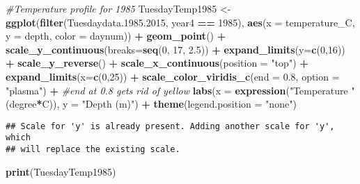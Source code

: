 \documentclass[]{article}
\newenvironment{Shaded}{\begin{snugshade}}{\end{snugshade}}
\newcommand{\CommentTok}[1]{\textcolor[rgb]{0.56,0.35,0.01}{\textit{#1}}}
\newcommand{\DataTypeTok}[1]{\textcolor[rgb]{0.13,0.29,0.53}{#1}}
\newcommand{\DecValTok}[1]{\textcolor[rgb]{0.00,0.00,0.81}{#1}}
\newcommand{\FloatTok}[1]{\textcolor[rgb]{0.00,0.00,0.81}{#1}}
\newcommand{\KeywordTok}[1]{\textcolor[rgb]{0.13,0.29,0.53}{\textbf{#1}}}
\newcommand{\NormalTok}[1]{#1}
\newcommand{\OperatorTok}[1]{\textcolor[rgb]{0.81,0.36,0.00}{\textbf{#1}}}
\newcommand{\StringTok}[1]{\textcolor[rgb]{0.31,0.60,0.02}{#1}}
\begin{document}
\begin{Shaded}
\begin{Highlighting}[]
\CommentTok{#Temperature profile for 1985 }
\NormalTok{TuesdayTemp1985 <-}\StringTok{ }
\StringTok{  }\KeywordTok{ggplot}\NormalTok{(}\KeywordTok{filter}\NormalTok{(Tuesdaydata.}\FloatTok{1985.2015}\NormalTok{, year4 }\OperatorTok{==}\StringTok{ }\DecValTok{1985}\NormalTok{), }\KeywordTok{aes}\NormalTok{(}\DataTypeTok{x =}\NormalTok{ temperature_C, }\DataTypeTok{y =}\NormalTok{ depth, }\DataTypeTok{color =}\NormalTok{ daynum)) }\OperatorTok{+}
\StringTok{  }\KeywordTok{geom_point}\NormalTok{() }\OperatorTok{+}
\StringTok{  }\KeywordTok{scale_y_continuous}\NormalTok{(}\DataTypeTok{breaks=}\KeywordTok{seq}\NormalTok{(}\DecValTok{0}\NormalTok{, }\DecValTok{17}\NormalTok{, }\FloatTok{2.5}\NormalTok{)) }\OperatorTok{+}
\StringTok{  }\KeywordTok{expand_limits}\NormalTok{(}\DataTypeTok{y=}\KeywordTok{c}\NormalTok{(}\DecValTok{0}\NormalTok{,}\DecValTok{16}\NormalTok{)) }\OperatorTok{+}
\StringTok{  }\KeywordTok{scale_y_reverse}\NormalTok{() }\OperatorTok{+}
\StringTok{  }\KeywordTok{scale_x_continuous}\NormalTok{(}\DataTypeTok{position =} \StringTok{"top"}\NormalTok{) }\OperatorTok{+}
\StringTok{  }\KeywordTok{expand_limits}\NormalTok{(}\DataTypeTok{x=}\KeywordTok{c}\NormalTok{(}\DecValTok{0}\NormalTok{,}\DecValTok{25}\NormalTok{)) }\OperatorTok{+}
\StringTok{  }\KeywordTok{scale_color_viridis_c}\NormalTok{(}\DataTypeTok{end =} \FloatTok{0.8}\NormalTok{, }\DataTypeTok{option =} \StringTok{"plasma"}\NormalTok{) }\OperatorTok{+}\StringTok{  }\CommentTok{#end at 0.8 gets rid of yellow}
\StringTok{  }\KeywordTok{labs}\NormalTok{(}\DataTypeTok{x =} \KeywordTok{expression}\NormalTok{(}\StringTok{"Temperature "}\NormalTok{(degree}\OperatorTok{*}\NormalTok{C)), }\DataTypeTok{y =} \StringTok{"Depth (m)"}\NormalTok{) }\OperatorTok{+}
\StringTok{  }\KeywordTok{theme}\NormalTok{(}\DataTypeTok{legend.position =} \StringTok{"none"}\NormalTok{)}
\end{Highlighting}
\end{Shaded}

\begin{verbatim}
## Scale for 'y' is already present. Adding another scale for 'y', which
## will replace the existing scale.
\end{verbatim}

\begin{Shaded}
\begin{Highlighting}[]
\KeywordTok{print}\NormalTok{(TuesdayTemp1985)}
\end{Highlighting}
\end{Shaded}
\end{document}
